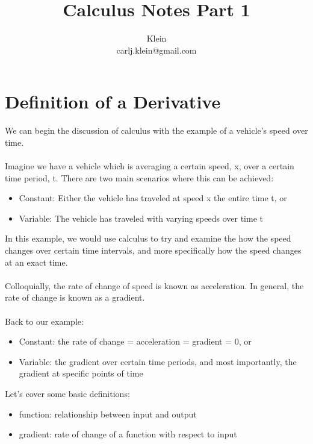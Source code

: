 \documentclass{article}
\begin{document}
\title{Calculus Notes Part 1}
\author{Klein \\ carlj.klein@gmail.com}
\date{}
\maketitle
	
\section{Definition of a Derivative}
We can begin the discussion of calculus with the example of a vehicle's speed over time.
\\\\
Imagine we have a vehicle which is averaging a certain speed, x, over a certain time period, t. There are two main scenarios where this can be achieved:
\begin{itemize}
	\item Constant: Either the vehicle has traveled at speed x the entire time t, or
	\item Variable: The vehicle has traveled with varying speeds over time t 
\end{itemize}
In this example, we would use calculus to try and examine the how the speed changes over certain time intervals, and more specifically how the speed changes at an exact time.
\\\\
Colloquially, the rate of change of speed is known as acceleration. In general, the rate of change is known as a gradient.
\\\\
Back to our example:
\begin{itemize}
	\item Constant: the rate of change = acceleration = gradient = 0, or
	\item Variable: the gradient over certain time periods, and most importantly, the gradient at specific points of time  
\end{itemize}
Let's cover some basic definitions:
\begin{itemize}
	\item function: relationship between input and output
	\item gradient: rate of change of a function with respect to input 
\end{itemize}
\end{document}
